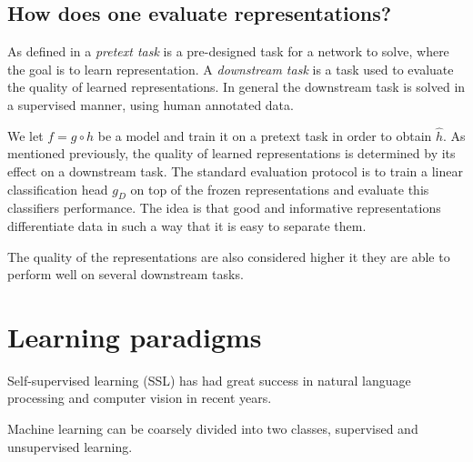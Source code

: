 \documentclass[../../thesis.tex]{subfiles}
\begin{document}


\subsection{How does one evaluate representations?}
As defined in \cite{jing2019selfsupervised} a \textit{pretext task} is a pre-designed task for a network to solve, where the goal is to learn representation. A \textit{downstream task} is a task used to evaluate the quality of learned representations. In general the downstream task is solved in a supervised manner, using human annotated data.


We let $f = g\circ h$ be a model and train it on a pretext task in order to obtain $\widehat{h}$. As mentioned previously, the quality of learned representations is determined by its effect on a downstream task.
The standard evaluation protocol is to train a linear classification head $g_D$ on top of the frozen representations and evaluate this classifiers performance. The idea is that good and informative representations differentiate data in such a way that it is easy to separate them. \newline

The quality of the representations are also considered higher it they are able to perform well on several downstream tasks. 



\section{Learning paradigms}

Self-supervised learning (SSL) has had great success in natural language processing and computer vision in recent years. 

Machine learning can be coarsely divided into two classes, supervised and unsupervised learning. 
\end{document}
